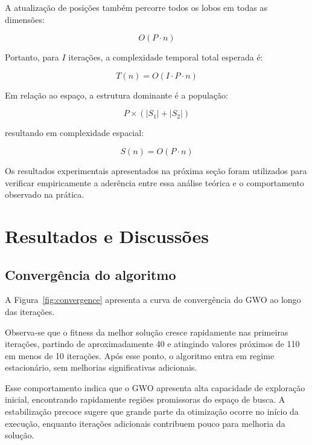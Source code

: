 \documentclass[12pt]{article}
\begin{document}
A atualização de posições também percorre todos os lobos em todas as dimensões:

\begin{equation}
    O(P \cdot n)
\end{equation}

Portanto, para $I$ iterações, a complexidade temporal total esperada é:

\begin{equation}
    T(n) = O(I \cdot P \cdot n) \label{eq:time_complexity}
\end{equation}

Em relação ao espaço, a estrutura dominante é a população:

\begin{equation}
    P \times (|S_1| + |S_2|)
\end{equation}

resultando em complexidade espacial:

\begin{equation}
    S(n) = O(P \cdot n) \label{eq:space_complexity}
\end{equation}

Os resultados experimentais apresentados na próxima seção foram utilizados para verificar empiricamente a aderência entre essa análise teórica e o comportamento observado na prática.

\section{Resultados e Discussões}

\subsection{Convergência do algoritmo}

A Figura~\ref{fig:convergence} apresenta a curva de convergência do GWO ao longo das iterações.

Observa-se que o fitness da melhor solução cresce rapidamente nas primeiras iterações, partindo de aproximadamente 40 e atingindo valores próximos de 110 em menos de 10 iterações. Após esse ponto, o algoritmo entra em regime estacionário, sem melhorias significativas adicionais.

Esse comportamento indica que o GWO apresenta alta capacidade de exploração inicial, encontrando rapidamente regiões promissoras do espaço de busca. A estabilização precoce sugere que grande parte da otimização ocorre no início da execução, enquanto iterações adicionais contribuem pouco para melhoria da solução.
\end{document}
